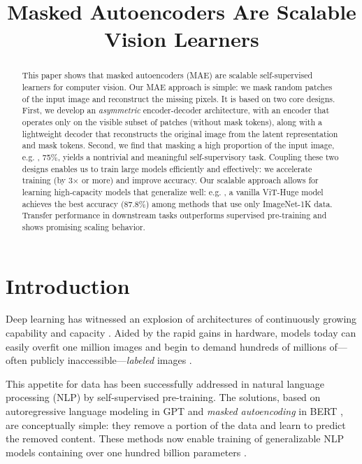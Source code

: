 \title{Masked Autoencoders Are Scalable Vision Learners}

\begin{abstract}
This paper shows that masked autoencoders (MAE) are scalable self-supervised learners for computer vision. Our MAE approach is simple: we mask random patches of the input image and reconstruct the missing pixels. It is based on two core designs. First, we develop an \mbox{\emph{asymmetric}} encoder-decoder architecture, with an encoder that operates only on the visible subset of patches (without mask tokens), along with a lightweight decoder that reconstructs the original image from the latent representation and mask tokens. Second, we find that masking a high proportion of the input image, e.g. , 75\%, yields a nontrivial and meaningful self-supervisory task. Coupling these two designs enables us to train large models efficiently and effectively: we accelerate training (by 3${\times}$ or more) and improve accuracy. Our scalable approach allows for learning high-capacity models that generalize well: e.g. , a vanilla \mbox{ViT-Huge} model achieves the best accuracy (87.8\%) among methods that use only ImageNet-1K data. Transfer performance in downstream tasks outperforms supervised pre-training and shows promising scaling behavior.
\end{abstract}

\section{Introduction}
\label{sec:intro}

Deep learning has witnessed an explosion of architectures of continuously growing capability and capacity \cite{Krizhevsky2012, He2016, Vaswani2017}. Aided by the rapid gains in hardware, models today can easily overfit one million images \cite{Deng2009} and begin to demand hundreds of millions of---often publicly inaccessible---\textit{labeled} images \cite{Dosovitskiy2021}.

This appetite for data has been successfully addressed in natural language processing (NLP) by self-supervised pre-training. The solutions, based on autoregressive language modeling in GPT \cite{Radford2018, Radford2019, Brown2020} and \emph{masked autoencoding} in BERT \cite{Devlin2019}, are conceptually simple: they remove a portion of the data and learn to predict the removed content. These methods now enable training of generalizable NLP models containing over one hundred billion parameters \cite{Brown2020}.

